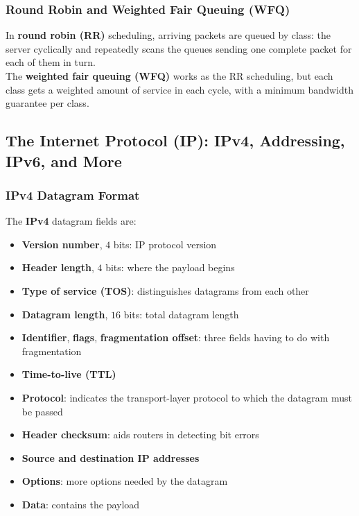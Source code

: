 \documentclass{article}
\begin{document}
\subsubsection*{Round Robin and Weighted Fair Queuing (WFQ)}
In \textbf{round robin (RR)} scheduling, arriving packets are queued by class: the server cyclically and repeatedly scans the queues sending one complete packet for each of them in turn. \\ The \textbf{weighted fair queuing (WFQ)} works as the RR scheduling, but each class gets a weighted amount of service in each cycle, with a minimum bandwidth guarantee per class.

\subsection{The Internet Protocol (IP): IPv4, Addressing, IPv6, and More}
\subsubsection{IPv4 Datagram Format}
The \textbf{IPv4} datagram fields are:
\begin{itemize}
    \item \textbf{Version number}, $4$ bits: IP protocol version
    \item \textbf{Header length}, $4$ bits: where the payload begins
    \item \textbf{Type of service (TOS)}: distinguishes datagrams from each other
    \item \textbf{Datagram length}, $16$ bits: total datagram length
    \item \textbf{Identifier}, \textbf{flags}, \textbf{fragmentation offset}: three fields having to do with fragmentation
    \item \textbf{Time-to-live (TTL)}
    \item \textbf{Protocol}: indicates the transport-layer protocol to which the datagram must be passed
    \item \textbf{Header checksum}: aids routers in detecting bit errors
    \item \textbf{Source and destination IP addresses}
    \item \textbf{Options}: more options needed by the datagram
    \item \textbf{Data}: contains the payload
\end{itemize} 
\end{document}
